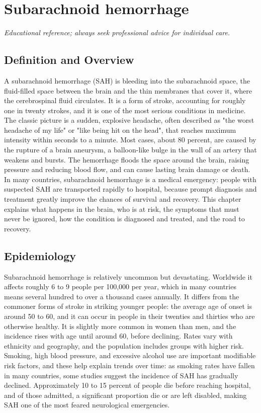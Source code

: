 \chapter{Subarachnoid hemorrhage}

\medskip
\noindent\textit{Educational reference; always seek professional advice for individual care.}

\section*{Definition and Overview}
A subarachnoid hemorrhage (SAH) is bleeding into the subarachnoid space, the fluid-filled space between the brain and the thin membranes that cover it, where the cerebrospinal fluid circulates. It is a form of stroke, accounting for roughly one in twenty strokes, and it is one of the most serious conditions in medicine. The classic picture is a sudden, explosive headache, often described as "the worst headache of my life" or "like being hit on the head", that reaches maximum intensity within seconds to a minute. Most cases, about 80 percent, are caused by the rupture of a brain aneurysm, a balloon-like bulge in the wall of an artery that weakens and bursts. The hemorrhage floods the space around the brain, raising pressure and reducing blood flow, and can cause lasting brain damage or death. In many countries, subarachnoid hemorrhage is a medical emergency: people with suspected SAH are transported rapidly to hospital, because prompt diagnosis and treatment greatly improve the chances of survival and recovery. This chapter explains what happens in the brain, who is at risk, the symptoms that must never be ignored, how the condition is diagnosed and treated, and the road to recovery.

\section*{Epidemiology}
Subarachnoid hemorrhage is relatively uncommon but devastating. Worldwide it affects roughly 6 to 9 people per 100,000 per year, which in many countries means several hundred to over a thousand cases annually. It differs from the commoner forms of stroke in striking younger people: the average age of onset is around 50 to 60, and it can occur in people in their twenties and thirties who are otherwise healthy. It is slightly more common in women than men, and the incidence rises with age until around 60, before declining. Rates vary with ethnicity and geography, and the population includes groups with higher risk. Smoking, high blood pressure, and excessive alcohol use are important modifiable risk factors, and these help explain trends over time: as smoking rates have fallen in many countries, some studies suggest the incidence of SAH has gradually declined. Approximately 10 to 15 percent of people die before reaching hospital, and of those admitted, a significant proportion die or are left disabled, making SAH one of the most feared neurological emergencies.

